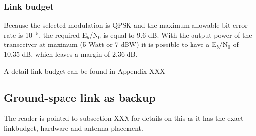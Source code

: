 \subsubsection{Link budget}
Because the selected modulation is QPSK and the maximum allowable bit error rate is 10$^{-5}$, the required E$_{b}$/N$_{0}$ is equal to 9.6 dB. With the output power of the transceiver at maximum (5 Watt or 7 dBW) it is possible to have a E$_{b}$/N$_{0}$ of 10.35 dB, which leaves a margin of 2.36 dB.

A detail link budget can be found in Appendix XXX

\subsection{Ground-space link as backup}
The reader is pointed to subsection XXX for details on this as it has the exact linkbudget, hardware and antenna placement. 

